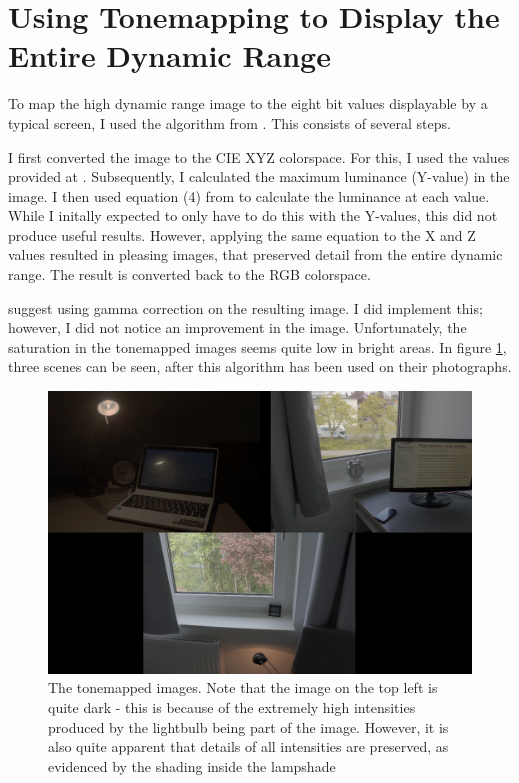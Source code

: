 \section{Using Tonemapping to Display the Entire Dynamic Range}\label{sec:toma}

To map the high dynamic range image to the eight bit values displayable by a
typical screen, I used the algorithm from \cite{dmac03}. This consists of
several steps.

I first converted the image to the CIE XYZ colorspace. For this,
I used the values provided at \cite{wik16}. Subsequently, I calculated the
maximum luminance (Y-value) in the image. I then used equation (4) from
\cite{dmac03} to calculate the luminance at each value. While I initally
expected to only have to do this with the Y-values, this did not produce useful
results. However, applying the same equation to the X and Z values resulted in
pleasing images, that preserved detail from the entire dynamic range. The
result is converted back to the RGB colorspace.

\cite{dmac03} suggest using gamma correction on the resulting image. I did
implement this; however, I did not notice an improvement in the image.
Unfortunately, the saturation in the tonemapped images seems quite low in
bright areas. In figure \ref{fig:toma}, three scenes can be seen,
after this algorithm has been used on their photographs.

\begin{figure}[ht]
  \centering
  \includegraphics[width=\textwidth]{toma.png}
  \caption{The tonemapped images. Note that the image on the top left is quite
  dark - this is because of the extremely high intensities produced by the
  lightbulb being part of the image. However, it is also quite apparent that
  details of all intensities are preserved, as evidenced by the shading inside
  the lampshade}
  \label{fig:toma}
\end{figure}
